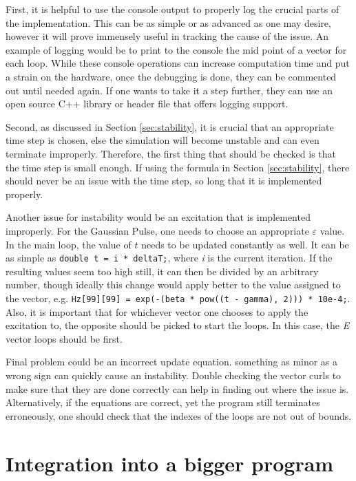 First, it is helpful to use the console output to properly log the crucial parts of the implementation. This can be as simple or as advanced as one may desire, however it will prove immensely useful in tracking the cause of the issue. An example of logging would be to print to the console the mid point of a vector for each loop. While these console operations can increase computation time and put a strain on the hardware, once the debugging is done, they can be commented out until needed again. If one wants to take it a step further, they can use an open source C++ library or header file that offers logging support. 

Second, as discussed in Section \ref{sec:stability}, it is crucial that an appropriate time step is chosen, else the simulation will become unstable and can even terminate improperly. Therefore, the first thing that should be checked is that the time step is small enough. If using the formula in  Section \ref{sec:stability}, there should never be an issue with the time step, so long that it is implemented properly.

Another issue for instability would be an excitation that is implemented improperly. For the Gaussian Pulse, one needs to choose an appropriate $\varepsilon$ value. In the main loop, the value of $t$ needs to be updated constantly as well. It can be as simple as \verb|double t = i * deltaT;|, where \textit{i} is the current iteration. If the resulting values seem too high still, it can then be divided by an arbitrary number, though ideally this change would apply better to the value assigned to the vector, e.g. \verb|Hz[99][99] = exp(-(beta * pow((t - gamma), 2))) * 10e-4;|. Also, it is important that for whichever vector one chooses to apply the excitation to, the opposite should be picked to start the loops. In this case, the \textit{E} vector loops should be first.

Final problem could be an incorrect update equation. something as minor as a wrong sign can quickly cause an instability. Double checking the vector curls to make sure that they are done correctly can help in finding out where the issue is. Alternatively, if the equations are correct, yet the program still terminates erroneously, one should check that the indexes of the loops are not out of bounds.

\section{Integration into a bigger program}

